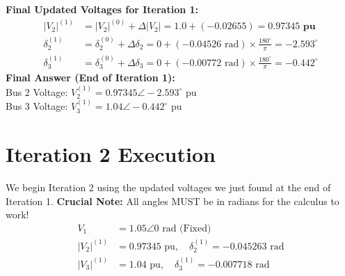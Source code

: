 \documentclass[11pt]{article}
\begin{document}
\begin{stepbox}
\textbf{Final Updated Voltages for Iteration 1:}
\begin{align*}
    |V_2|^{(1)} &= |V_2|^{(0)} + \Delta |V_2| = 1.0 + (-0.02655) = \mathbf{0.97345 \text{ pu}} \\
    \delta_2^{(1)} &= \delta_2^{(0)} + \Delta \delta_2 = 0 + (-0.04526 \text{ rad}) \times \frac{180^\circ}{\pi} = \mathbf{-2.593^\circ} \\
    \delta_3^{(1)} &= \delta_3^{(0)} + \Delta \delta_3 = 0 + (-0.00772 \text{ rad}) \times \frac{180^\circ}{\pi} = \mathbf{-0.442^\circ}
\end{align*}
\vspace{0.3cm}
\textbf{Final Answer (End of Iteration 1):} \\
Bus 2 Voltage: $V_2^{(1)} = 0.97345 \angle -2.593^\circ \text{ pu}$ \\
Bus 3 Voltage: $V_3^{(1)} = 1.04 \angle -0.442^\circ \text{ pu}$
\end{stepbox}



\newpage
\section*{Iteration 2 Execution}

\begin{stepbox}
We begin Iteration 2 using the updated voltages we just found at the end of Iteration 1. 
\textbf{Crucial Note:} All angles MUST be in radians for the calculus to work!
\begin{align*}
    V_1 &= 1.05 \angle 0 \text{ rad (Fixed)} \\
    |V_2|^{(1)} &= 0.97345 \text{ pu}, \quad \delta_2^{(1)} = -0.045263 \text{ rad} \\
    |V_3|^{(1)} &= 1.04 \text{ pu}, \quad \delta_3^{(1)} = -0.007718 \text{ rad}
\end{align*}
\end{stepbox}
\end{document}
